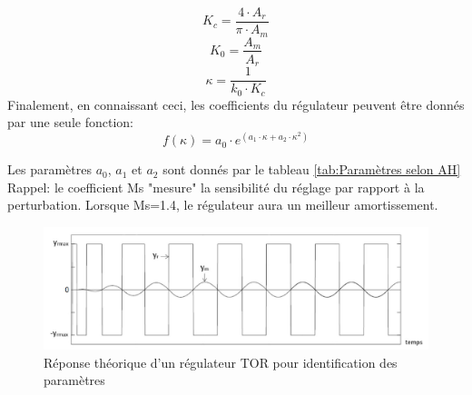\begin{equation}
	K_c=\frac{4\cdot A_r}{\pi \cdot A_m}
	\label{eq:gain critique}
\end{equation}
\begin{equation}
	K_0=\frac{A_m}{A_r}
	\label{eq:gain statique}
\end{equation}
\begin{equation}
	\kappa=\frac{1}{k_0 \cdot K_c}
	\label{eq:gain relatif}
\end{equation}
Finalement, en connaissant ceci, les coefficients du régulateur peuvent être donnés par une seule fonction:
\begin{equation}
	f(\kappa)=a_0\cdot e^{(a_1\cdot \kappa+ a_2 \cdot \kappa^2)}
	\label{eq:AH}
\end{equation}

Les paramètres $a_0$, $a_1$ et $a_2$ sont donnés par le tableau \ref{tab:Paramètres selon AH}\\
Rappel: le coefficient Ms "mesure" la sensibilité du réglage par rapport à la perturbation. Lorsque Ms=1.4, le régulateur aura un meilleur amortissement. \cite{AHAut}

\begin{figure}[h]
	\centering
	\includegraphics[width=\linewidth]{img/RepTorTheorie}
	\caption{Réponse théorique d'un régulateur TOR pour identification des paramètres}
	\label{fig:Réponse théorique d'un régulateur TOR pour identification des paramètres}
\end{figure}	

